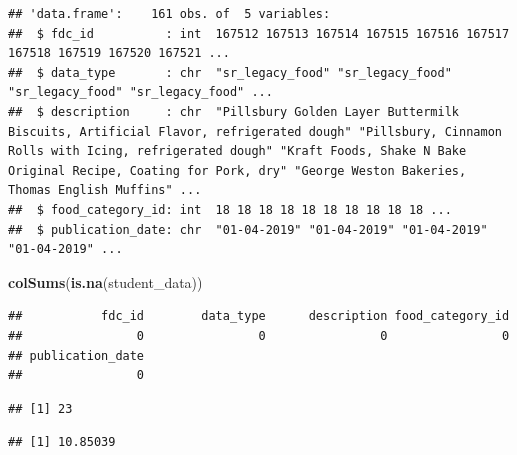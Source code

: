 \documentclass[
]{article}
\newenvironment{Shaded}{\begin{snugshade}}{\end{snugshade}}
\newcommand{\FunctionTok}[1]{\textcolor[rgb]{0.13,0.29,0.53}{\textbf{#1}}}
\newcommand{\NormalTok}[1]{#1}
\newcommand{\SpecialCharTok}[1]{\textcolor[rgb]{0.81,0.36,0.00}{\textbf{#1}}}
\begin{document}
\begin{verbatim}
## 'data.frame':    161 obs. of  5 variables:
##  $ fdc_id          : int  167512 167513 167514 167515 167516 167517 167518 167519 167520 167521 ...
##  $ data_type       : chr  "sr_legacy_food" "sr_legacy_food" "sr_legacy_food" "sr_legacy_food" ...
##  $ description     : chr  "Pillsbury Golden Layer Buttermilk Biscuits, Artificial Flavor, refrigerated dough" "Pillsbury, Cinnamon Rolls with Icing, refrigerated dough" "Kraft Foods, Shake N Bake Original Recipe, Coating for Pork, dry" "George Weston Bakeries, Thomas English Muffins" ...
##  $ food_category_id: int  18 18 18 18 18 18 18 18 18 18 ...
##  $ publication_date: chr  "01-04-2019" "01-04-2019" "01-04-2019" "01-04-2019" ...
\end{verbatim}

\begin{Shaded}
\begin{Highlighting}[]
\FunctionTok{colSums}\NormalTok{(}\FunctionTok{is.na}\NormalTok{(student\_data))}
\end{Highlighting}
\end{Shaded}

\begin{verbatim}
##           fdc_id        data_type      description food_category_id 
##                0                0                0                0 
## publication_date 
##                0
\end{verbatim}

\begin{Shaded}
\end{Shaded}

\begin{verbatim}
## [1] 23
\end{verbatim}

\begin{Shaded}
\end{Shaded}

\begin{verbatim}
## [1] 10.85039
\end{verbatim}

\begin{Shaded}
\end{Shaded}
\end{document}
